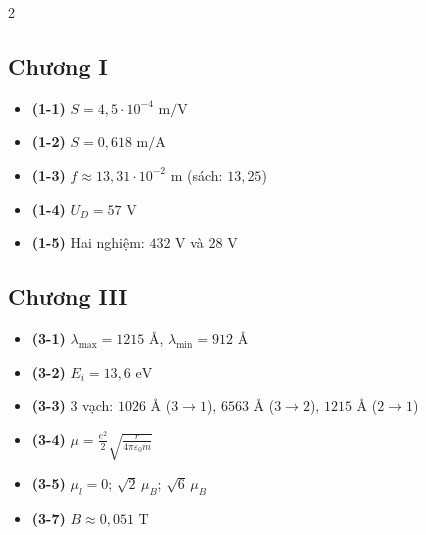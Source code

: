 \documentclass[11pt,a4paper]{article}
\begin{document}
\begin{multicols}{2}
\subsection*{Chương I}
\begin{itemize}[itemsep=0.5pt, topsep=1pt, parsep=0pt, leftmargin=1.8em]
  \item \textbf{(1-1)} $S = 4{,}5 \cdot 10^{-4}\text{ m/V}$
  \item \textbf{(1-2)} $S = 0{,}618\text{ m/A}$
  \item \textbf{(1-3)} $f \approx 13{,}31 \cdot 10^{-2}\text{ m}$ (sách: $13{,}25$)
  \item \textbf{(1-4)} $U_D = 57\text{ V}$
  \item \textbf{(1-5)} Hai nghiệm: $432\text{ V}$ và $28\text{ V}$
\end{itemize}

\columnbreak

\subsection*{Chương III}
\begin{itemize}[itemsep=0.5pt, topsep=1pt, parsep=0pt, leftmargin=1.8em]
  \item \textbf{(3-1)} $\lambda_{\max} = 1215\text{ \AA}$, $\lambda_{\min} = 912\text{ \AA}$
  \item \textbf{(3-2)} $E_i = 13{,}6\text{ eV}$
  \item \textbf{(3-3)} 3 vạch: $1026\text{ \AA}$ ($3\to1$), $6563\text{ \AA}$ ($3\to2$), $1215\text{ \AA}$ ($2\to1$)
  \item \textbf{(3-4)} $\mu = \frac{e^2}{2}\sqrt{\frac{r}{4\pi\varepsilon_0 m}}$
  \item \textbf{(3-5)} $\mu_l = 0$; $\sqrt2\,\mu_B$; $\sqrt6\,\mu_B$
  \item \textbf{(3-7)} $B \approx 0{,}051\text{ T}$
\end{itemize}
\end{multicols}
\end{document}
